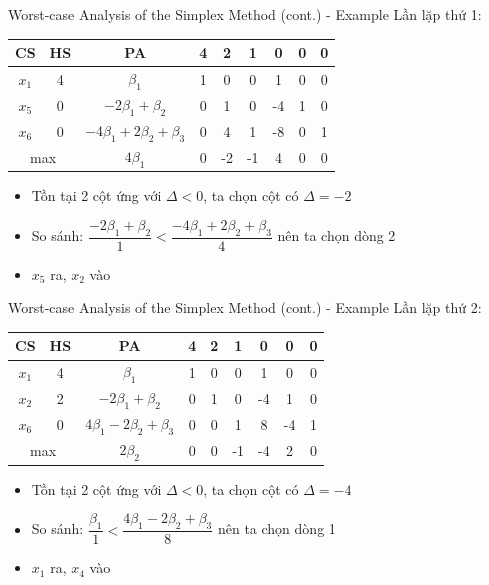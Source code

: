 \documentclass[10pt]{beamer}
\begin{document}
\begin{frame}{Worst-case Analysis of the Simplex Method (cont.) - Example}
Lần lặp thứ 1:
\begin{table}[H]
\centering
\begin{tabular}{|c|c|c|c|c|c|c|c|c|}
\hline
CS & HS & PA & 4 & 2 & 1 & 0 & 0 & 0 \\
\hline
$x_1$ & 4 & $\beta_1$ & 1 & 0 & 0 & 1 & 0 & 0 \\
$x_5$ & 0 & $-2\beta_1 + \beta_2$ & 0 & 1 & 0 & -4 & 1 & 0 \\
$x_6$ & 0 & $-4\beta_1 + 2\beta_2 + \beta_3$ & 0 & 4 & 1 & -8 & 0 & 1 \\
\hline
\multicolumn{2}{|c|}{max}
& $4\beta_1$ & 0 & -2 & -1 & 4 & 0 & 0 \\
\hline
\end{tabular}
\end{table}
\begin{itemize}
\item Tồn tại 2 cột ứng với $\Delta < 0$, ta chọn cột có $\Delta = -2$
\item So sánh: $\dfrac{-2\beta_1 + \beta_2}{1} < \dfrac{-4\beta_1 + 2\beta_2 + \beta_3}{4}$ nên ta chọn dòng 2
\item $x_5$ ra, $x_2$ vào
\end{itemize}
\end{frame}

\begin{frame}{Worst-case Analysis of the Simplex Method (cont.) - Example}
Lần lặp thứ 2:
\begin{table}[H]
\centering
\begin{tabular}{|c|c|c|c|c|c|c|c|c|}
\hline
CS & HS & PA & 4 & 2 & 1 & 0 & 0 & 0 \\
\hline
$x_1$ & 4 & $\beta_1$ & 1 & 0 & 0 & 1 & 0 & 0 \\
$x_2$ & 2 & $-2\beta_1 + \beta_2$ & 0 & 1 & 0 & -4 & 1 & 0 \\
$x_6$ & 0 & $4\beta_1 - 2\beta_2 + \beta_3$ & 0 & 0 & 1 & 8 & -4 & 1 \\
\hline
\multicolumn{2}{|c|}{max}
& $2\beta_2$ & 0 & 0 & -1 & -4 & 2 & 0 \\
\hline
\end{tabular}
\end{table}
\begin{itemize}
\item Tồn tại 2 cột ứng với $\Delta < 0$, ta chọn cột có $\Delta = -4$
\item So sánh: $\dfrac{\beta_1}{1} < \dfrac{4\beta_1 - 2\beta_2 + \beta_3}{8}$ nên ta chọn dòng 1
\item $x_1$ ra, $x_4$ vào
\end{itemize}
\end{frame}
\end{document}
